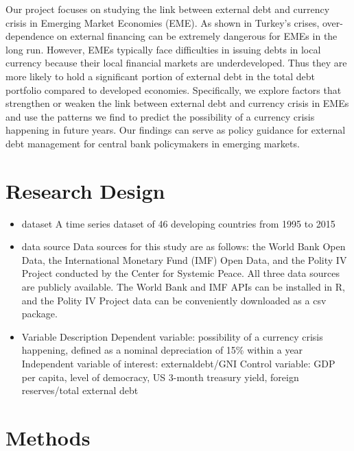 \documentclass[12pt,]{article}
\providecommand{\tightlist}{%
  \setlength{\itemsep}{0pt}\setlength{\parskip}{0pt}}
\begin{document}
Our project focuses on studying the link between external debt and
currency crisis in Emerging Market Economies (EME). As shown in Turkey's
crises, over-dependence on external financing can be extremely dangerous
for EMEs in the long run. However, EMEs typically face difficulties in
issuing debts in local currency because their local financial markets
are underdeveloped. Thus they are more likely to hold a significant
portion of external debt in the total debt portfolio compared to
developed economies. Specifically, we explore factors that strengthen or
weaken the link between external debt and currency crisis in EMEs and
use the patterns we find to predict the possibility of a currency crisis
happening in future years. Our findings can serve as policy guidance for
external debt management for central bank policymakers in emerging
markets.

\section{Research Design}

\begin{itemize}
\tightlist
\item
  dataset A time series dataset of 46 developing countries from 1995 to
  2015
\item
  data source Data sources for this study are as follows: the World Bank
  Open Data, the International Monetary Fund (IMF) Open Data, and the
  Polity IV Project conducted by the Center for Systemic Peace. All
  three data sources are publicly available. The World Bank and IMF APIs
  can be installed in R, and the Polity IV Project data can be
  conveniently downloaded as a csv package.\\
\item
  Variable Description Dependent variable: possibility of a currency
  crisis happening, defined as a nominal depreciation of 15\% within a
  year Independent variable of interest: externaldebt/GNI Control
  variable: GDP per capita, level of democracy, US 3-month treasury
  yield, foreign reserves/total external debt
\end{itemize}

\section{Methods}
\end{document}
